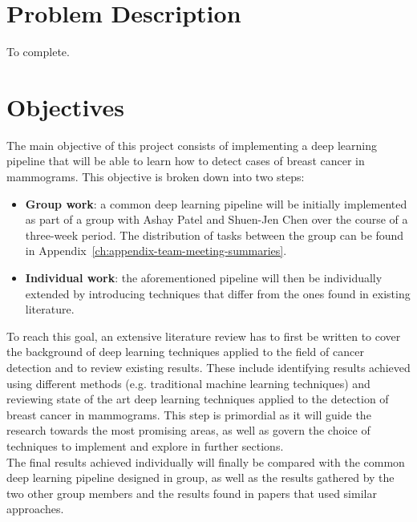 \section{Problem Description}
\label{sec:problem-description}

To complete.


\section{Objectives}
\label{sec:introduction-objectives}

The main objective of this project consists of implementing a deep learning pipeline that will be able to learn how to detect cases of breast cancer in mammograms. This objective is broken down into two steps:
\begin{itemize}
    \item \textbf{Group work}: a common deep learning pipeline will be initially implemented as part of a group with Ashay Patel and Shuen-Jen Chen over the course of a three-week period. The distribution of tasks between the group can be found in Appendix~\ref{ch:appendix-team-meeting-summaries}.
    \item \textbf{Individual work}: the aforementioned pipeline will then be individually extended by introducing techniques that differ from the ones found in existing literature.
\end{itemize}

To reach this goal, an extensive literature review has to first be written to cover the background of deep learning techniques applied to the field of cancer detection and to review existing results. These include identifying results achieved using different methods (e.g. traditional machine learning techniques) and reviewing state of the art deep learning techniques applied to the detection of breast cancer in mammograms. This step is primordial as it will guide the research towards the most promising areas, as well as govern the choice of techniques to implement and explore in further sections.\\

The final results achieved individually will finally be compared with the common deep learning pipeline designed in group, as well as the results gathered by the two other group members and the results found in papers that used similar approaches.


